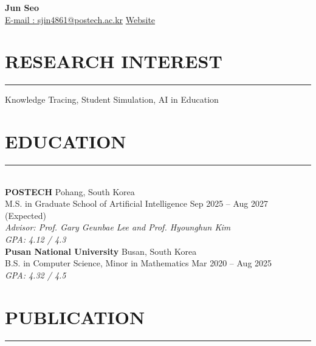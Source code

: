 \documentclass[11pt]{article}
\newcommand{\sectionline}{\vspace{-0.5ex}\noindent\rule{\textwidth}{0.4pt}\vspace{0.6ex}}
\begin{document}
\begin{center}
  {\LARGE \textbf{Jun Seo}}\\
  \href{mailto:sjin4861@postech.ac.kr}{E-mail : sjin4861@postech.ac.kr}
  \quad
  \href{https://sjin4861.github.io/}{Website}
\end{center}
\vspace{4pt}

\section*{RESEARCH INTEREST}
\sectionline

Knowledge Tracing, Student Simulation, AI in Education 
\\
\section*{EDUCATION}
\sectionline
\\
\textbf{POSTECH} \hfill Pohang, South Korea \\
M.S. in Graduate School of Artificial Intelligence \hfill Sep 2025 -- Aug 2027 (Expected) \\
\textit{Advisor: Prof. Gary Geunbae Lee and Prof. Hyounghun Kim} \\
\textit{GPA: 4.12 / 4.3} \\
\textbf{Pusan National University} \hfill Busan, South Korea\\
B.S. in Computer Science, Minor in Mathematics \hfill Mar 2020 -- Aug 2025\\
\textit{GPA: 4.32 / 4.5}%

\vspace{10pt}
\section*{PUBLICATION}
\sectionline
\end{document}
